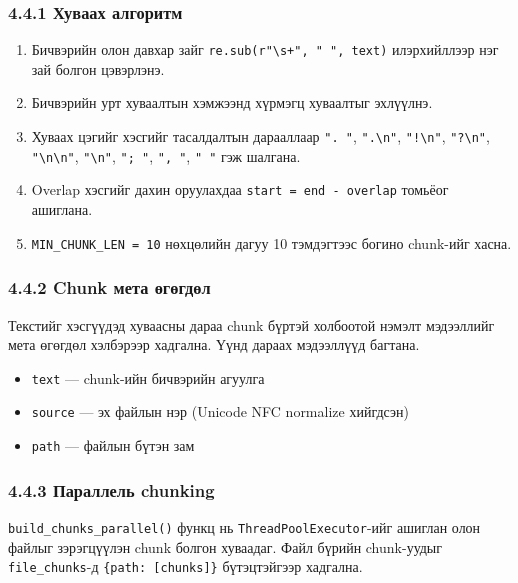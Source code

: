 \documentclass[11pt,a4paper]{article}
\begin{document}
\subsubsection*{4.4.1 Хуваах алгоритм}

\begin{enumerate}
      \item Бичвэрийн олон давхар зайг \texttt{re.sub(r"\textbackslash s+", " ", text)} илэрхийллээр нэг зай болгон цэвэрлэнэ.
      \item Бичвэрийн урт хуваалтын хэмжээнд хүрмэгц хуваалтыг эхлүүлнэ.
      \item Хуваах цэгийг хэсгийг тасалдалтын дарааллаар \texttt{". "}, \texttt{".\textbackslash n"}, \texttt{"!\textbackslash n"}, \texttt{"?\textbackslash n"}, \texttt{"\textbackslash n\textbackslash n"}, \texttt{"\textbackslash n"}, \texttt{"; "}, \texttt{", "}, \texttt{" "} гэж шалгана.
      \item Overlap хэсгийг дахин оруулахдаа \texttt{start = end - overlap} томьёог ашиглана.
      \item \texttt{MIN\_CHUNK\_LEN = 10} нөхцөлийн дагуу 10 тэмдэгтээс богино chunk-ийг хасна.
\end{enumerate}

\subsubsection*{4.4.2 Chunk мета өгөгдөл}

Текстийг хэсгүүдэд хуваасны дараа chunk бүртэй холбоотой нэмэлт мэдээллийг мета өгөгдөл хэлбэрээр хадгална. Үүнд дараах мэдээллүүд багтана.
\begin{itemize}
    \item \texttt{text} --- chunk-ийн бичвэрийн агуулга
    \item \texttt{source} --- эх файлын нэр (Unicode NFC normalize хийгдсэн)
    \item \texttt{path} --- файлын бүтэн зам
\end{itemize}

\subsubsection*{4.4.3 Параллель chunking}

\texttt{build\_chunks\_parallel()} функц нь \texttt{ThreadPoolExecutor}-ийг ашиглан олон файлыг зэрэгцүүлэн chunk болгон хуваадаг. Файл бүрийн chunk-уудыг \texttt{file\_chunks}-д \texttt{\{path: [chunks]\}} бүтэцтэйгээр хадгална.
\end{document}
